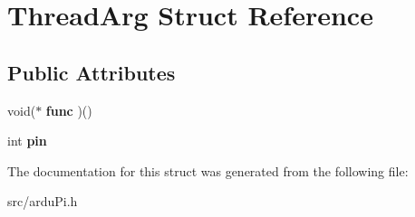\hypertarget{struct_thread_arg}{}\section{Thread\+Arg Struct Reference}
\label{struct_thread_arg}
\subsection*{Public Attributes}
\begin{DoxyCompactItemize}
\item 
\hypertarget{struct_thread_arg_a699dc083d8145068851102844204fd7d}{}void($\ast$ {\bfseries func} )()\label{struct_thread_arg_a699dc083d8145068851102844204fd7d}

\item 
\hypertarget{struct_thread_arg_a85ce9c4459ab1209c74847c74a661775}{}int {\bfseries pin}\label{struct_thread_arg_a85ce9c4459ab1209c74847c74a661775}

\end{DoxyCompactItemize}


The documentation for this struct was generated from the following file\+:\begin{DoxyCompactItemize}
\item 
src/ardu\+Pi.\+h\end{DoxyCompactItemize}
